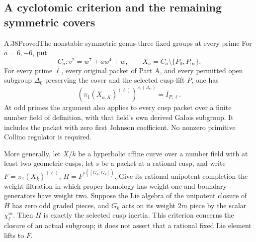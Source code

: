 \subsection{A cyclotomic criterion and the remaining symmetric covers}

\begin{statement}{A.38}{Proved}{The nonstable symmetric genus-three fixed groups at every prime}
For \(a=6,-6\), put
\[
 C_a:v^2=w^7+aw^4+w,\qquad
 X_a=C_a\setminus\{P_0,P_\infty\}.
\]
For every prime \(\ell\), every original packet of Part A,
and every permitted open subgroup \(\Delta_0\) preserving
the cover and the selected cusp lift \(P\), one has
\[
 \left(\pi_1(X_{a,\overline K})^{(\ell)}\right)^{s_b(\Delta_0)}
                =I_{P,\ell}.                         \tag{A.38.1}
\]
At odd primes the argument also applies to every cusp
packet over a finite number field of definition, with
that field's own derived Galois subgroup. It includes
the packet with zero first Johnson coefficient.
No nonzero primitive Collino regulator is required.

More generally, let \(X/k\) be a hyperbolic affine curve
over a number field with at least two geometric cusps,
let \(s\) be a packet at a rational cusp, and write
\(F=\pi_1(X_{\bar k})^{(\ell)}\),
\(H=F^{s(\overline{[G_k,G_k]})}\).
Give its rational unipotent completion the weight
filtration in which proper homology has weight one
and boundary generators have weight two. Suppose the
Lie algebra of the unipotent closure of \(H\) has
zero odd graded pieces, and \(G_k\) acts on its
weight \(2m\) piece by the scalar \(\chi_\ell^m\).
Then \(H\) is exactly the selected cusp inertia.
This criterion concerns the closure of an actual
subgroup; it does not assert that a rational fixed
Lie element lifts to \(F\).
\end{statement}

